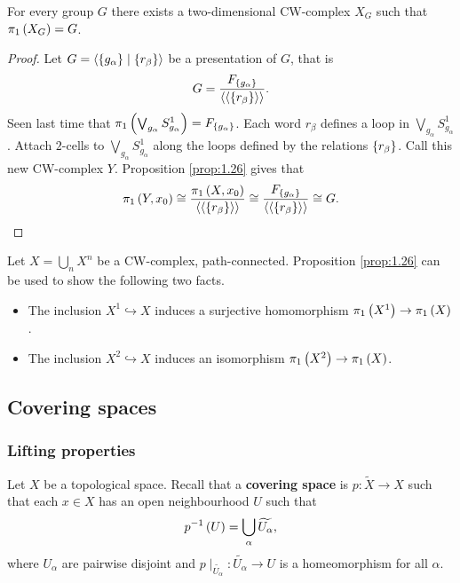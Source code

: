 
\begin{corollary}
For every group $ G $ there exists a two-dimensional CW-complex $ X_G $ such that $ \pi_1\left( X_G \right) = G $.
\end{corollary}

\begin{proof}
Let $ G = \left\langle \left\{ g_\alpha \right\} \mid \left\{ r_\beta \right\} \right\rangle $ be a presentation of $ G $, that is
$$ G = \dfrac{F_{\left\{ g_\alpha \right\}}}{\left\langle \left\langle \left\{ r_\beta \right\} \right\rangle \right\rangle}. $$
Seen last time that $ \pi_1\left( \bigvee_{g_\alpha} S_{g_\alpha}^1 \right) = F_{\left\{ g_\alpha \right\}} $. Each word $ r_\beta $ defines a loop in $ \bigvee_{g_\alpha} S_{g_\alpha}^1 $. Attach $ 2 $-cells to $ \bigvee_{g_\alpha} S_{g_\alpha}^1 $ along the loops defined by the relations $ \left\{ r_\beta \right\} $. Call this new CW-complex $ Y $. Proposition \ref{prop:1.26} gives that
$$ \pi_1\left( Y, x_0 \right) \cong \dfrac{\pi_1\left( X, x_0 \right)}{\left\langle \left\langle \left\{ r_\beta \right\} \right\rangle \right\rangle} \cong \dfrac{F_{\left\{ g_\alpha \right\}}}{\left\langle \left\langle \left\{ r_\beta \right\} \right\rangle \right\rangle} \cong G. $$
\end{proof}

\begin{remark*}
Let $ X = \bigcup_n X^n $ be a CW-complex, path-connected. Proposition \ref{prop:1.26} can be used to show the following two facts.
\begin{itemize}
\item The inclusion $ X^1 \hookrightarrow X $ induces a surjective homomorphism $ \pi_1\left( X^1 \right) \to \pi_1\left( X \right) $.
\item The inclusion $ X^2 \hookrightarrow X $ induces an isomorphism $ \pi_1\left( X^2 \right) \to \pi_1\left( X \right) $.
\end{itemize}
\end{remark*}

\pagebreak

\subsection{Covering spaces}

\subsubsection{Lifting properties}

Let $ X $ be a topological space. Recall that a \textbf{covering space} is $ p : \widetilde{X} \to X $ such that each $ x \in X $ has an open neighbourhood $ U $ such that
$$ p^{-1}\left( U \right) = \bigcup_\alpha \widetilde{U_\alpha}, $$
where $ U_\alpha $ are pairwise disjoint and $ p \mid_{\widetilde{U_\alpha}} : \widetilde{U_\alpha} \to U $ is a homeomorphism for all $ \alpha $.

